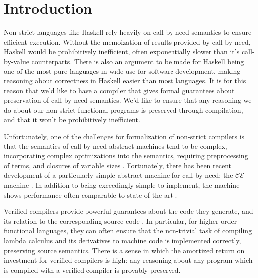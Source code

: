 \section{Introduction} \label{sec:introduction}
Non-strict languages like Haskell rely heavily on call-by-need semantics to
ensure efficient execution. Without the memoization of results provided by
call-by-need, Haskell would be prohibitively inefficient, often exponentially
slower than it's call-by-value counterparts. There is also an argument to be
made for Haskell being one of the most pure languages in wide use for software
development, making reasoning about correctness in Haskell easier than most
languages. It is for this reason that we'd like to have a compiler that gives
formal guarantees about preservation of call-by-need semantics. We'd like to
ensure that any reasoning we do about our non-strict functional programs is
preserved through compilation, and that it won't be prohibitively inefficient.

Unfortunately, one of the challenges for formalization of non-strict compilers
is that the semantics of call-by-need abstract machines tend to be complex,
incorporating complex optimizations into the semantics, requiring preprocessing
of terms, and closures of variable sizes \cite{stg, TIM}. Fortunately, there has
been recent development of a particularly simple abstract machine for
call-by-need: the $\mathcal{CE}$ machine \cite{cem}. In addition to being
exceedingly simple to implement, the machine shows performance often comparable
to state-of-the-art \cite{cem}.

Verified compilers provide powerful guarantees about the code they generate, and
its relation to the corresponding source code \cite{chlipala, compcert, cakeml}.
In particular, for higher order functional languages, they can often ensure that
the non-trivial task of compiling lambda calculus and its derivatives to machine
code is implemented correctly, preserving source semantics. There is a sense in
which the amortized return on investment for verified compilers is high: any
reasoning about any program which is compiled with a verified compiler is
provably preserved. 

